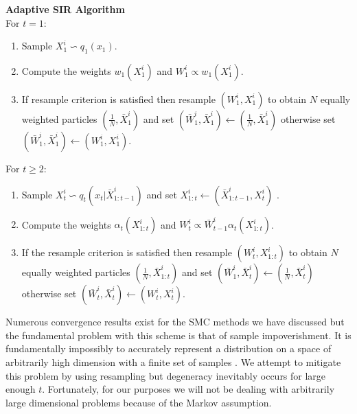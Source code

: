 \documentclass[../masters.tex]{subfiles}
\begin{document}
\textbf{Adaptive SIR Algorithm}\\
For $t=1$:
\begin{enumerate}
\item
Sample $X^i_1 \backsim q_1(x_1)$.
\item
Compute the weights $w_1(X_1^i)$ and $W^i_1 \propto w_1(X^i_1)$.
\item
If resample criterion is satisfied then resample $(W^i_1, X^i_1)$ to obtain $N$ equally weighted particles $(\frac{1}{N}, \bar{X}^i_1)$ and set $(\bar{W}^i_1, \bar{X}^i_1) \leftarrow (\frac{1}{N}, \bar{X}^i_1)$ otherwise set $(\bar{W}^i_1, \bar{X}^i_1) \leftarrow ({W}^i_1, {X}^i_1)$.
\end{enumerate}
For $t \geq 2$:
\begin{enumerate}
\item
Sample $X^i_t \backsim q_t(x_t|\bar{X}^i_{1:t-1})$ and set ${X}^i_{1:t} \leftarrow (\bar{X}^i_{1:t-1}, X^i_t)$ .
\item
Compute the weights $\alpha_t(X^i_{1:t})$ and $W^i_t \propto \bar{W}^i_{t-1}\alpha_t(X^i_{1:t})$.
\item
If the resample criterion is satisfied then resample $(W^i_t, X^i_{1:t})$ to obtain $N$ equally weighted particles $(\frac{1}{N}, \bar{X}^i_{1:t})$ and set $(\bar{W}^i_1, \bar{X}^i_t) \leftarrow (\frac{1}{N}, \bar{X}^i_t)$ otherwise set $(\bar{W}^i_t, \bar{X}^i_t) \leftarrow ({W}^i_t, {X}^i_t)$.
\end{enumerate}

Numerous convergence results exist for the SMC methods we have discussed but the fundamental problem with this scheme is that of sample impoverishment. It is fundamentally impossibly to accurately represent a distribution on a space of arbitrarily high dimension with a finite set of samples \cite{pftut}. We attempt to mitigate this problem by using resampling but degeneracy inevitably occurs for large enough $t$. Fortunately, for our purposes we will not be dealing with arbitrarily large dimensional problems because of the Markov assumption.
\end{document}
